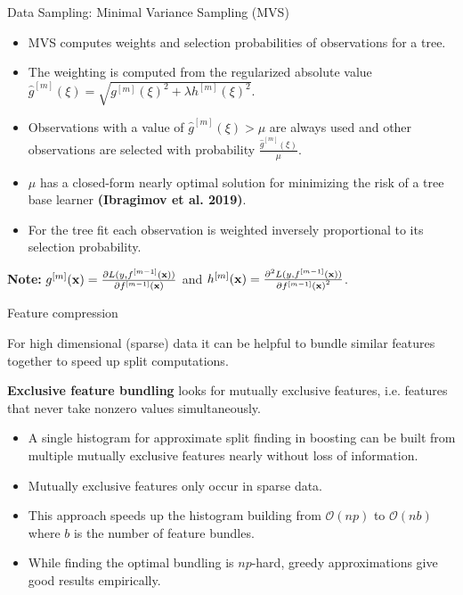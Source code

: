 \documentclass[11pt,compress,t,notes=noshow, xcolor=table]{beamer}
\begin{document}
\begin{vbframe}{Data Sampling: Minimal Variance Sampling (MVS)}


\begin{itemize}
  \item MVS computes weights and selection probabilities of observations for a tree.
  \item The weighting is computed from the regularized absolute value $\hat{g}^{[m]}(\xi)=\sqrt{g^{[m]}(\xi)^2 + \lambda h^{[m]}(\xi)^2}$.
  \item Observations with a value of $\hat{g}^{[m]}(\xi) > \mu$ are always used and other observations are selected with probability $\frac{\hat{g}^{[m]}(\xi)}{\mu}$.
  \item $\mu$ has a closed-form nearly optimal solution for minimizing the risk of a tree base learner \textbf{(Ibragimov et al. 2019)}.
  \item For the tree fit each observation is weighted inversely proportional to its selection probability.
\end{itemize}

\lz

\textbf{Note:} $g^{[m]}(\mathbf{x}) = \frac{\partial L(y, f^{[m-1]}(\mathbf{x}))}{\partial f^{[m-1]}(\mathbf{x})}$ and $h^{[m]}(\mathbf{x}) = \frac{\partial^2 L(y, f^{[m-1]}(\mathbf{x}))}{\partial {f^{[m-1]}(\mathbf{x})}^2}$.

\end{vbframe}


\begin{vbframe}{Feature compression}

For high dimensional (sparse) data it can be helpful to bundle similar features together to speed up split computations.

\lz

\textbf{Exclusive feature bundling} looks for mutually exclusive features, i.e. features that never take nonzero values simultaneously.

\lz

\begin{itemize}
  \item A single histogram for approximate split finding in boosting can be built from multiple mutually exclusive features nearly without loss of information.
  \item Mutually exclusive features only occur in sparse data.
  \item This approach speeds up the histogram building from $\mathcal{O}(np)$ to $\mathcal{O}(nb)$ where $b$ is the number of feature bundles.
  \item While finding the optimal bundling is $np$-hard, greedy approximations give good results empirically.
\end{itemize}

\end{vbframe}
\end{document}
